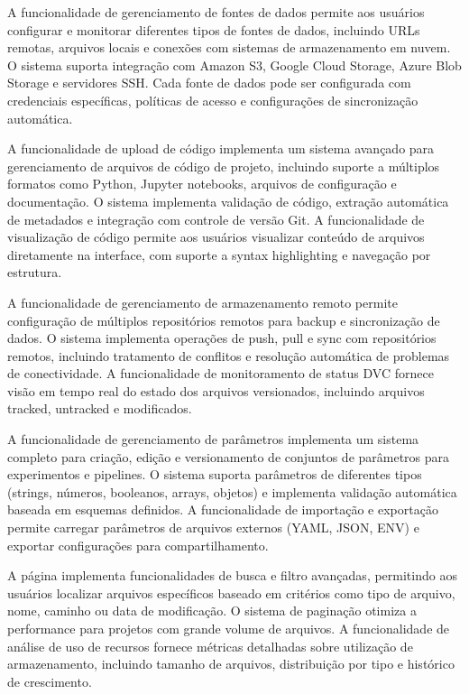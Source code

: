\documentclass[12pt,a4paper]{article}
\begin{document}
A funcionalidade de gerenciamento de fontes de dados permite aos usuários configurar e monitorar diferentes tipos de fontes de dados, incluindo URLs remotas, arquivos locais e conexões com sistemas de armazenamento em nuvem. O sistema suporta integração com Amazon S3, Google Cloud Storage, Azure Blob Storage e servidores SSH. Cada fonte de dados pode ser configurada com credenciais específicas, políticas de acesso e configurações de sincronização automática.

A funcionalidade de upload de código implementa um sistema avançado para gerenciamento de arquivos de código de projeto, incluindo suporte a múltiplos formatos como Python, Jupyter notebooks, arquivos de configuração e documentação. O sistema implementa validação de código, extração automática de metadados e integração com controle de versão Git. A funcionalidade de visualização de código permite aos usuários visualizar conteúdo de arquivos diretamente na interface, com suporte a syntax highlighting e navegação por estrutura.

A funcionalidade de gerenciamento de armazenamento remoto permite configuração de múltiplos repositórios remotos para backup e sincronização de dados. O sistema implementa operações de push, pull e sync com repositórios remotos, incluindo tratamento de conflitos e resolução automática de problemas de conectividade. A funcionalidade de monitoramento de status DVC fornece visão em tempo real do estado dos arquivos versionados, incluindo arquivos tracked, untracked e modificados.

A funcionalidade de gerenciamento de parâmetros implementa um sistema completo para criação, edição e versionamento de conjuntos de parâmetros para experimentos e pipelines. O sistema suporta parâmetros de diferentes tipos (strings, números, booleanos, arrays, objetos) e implementa validação automática baseada em esquemas definidos. A funcionalidade de importação e exportação permite carregar parâmetros de arquivos externos (YAML, JSON, ENV) e exportar configurações para compartilhamento.

A página implementa funcionalidades de busca e filtro avançadas, permitindo aos usuários localizar arquivos específicos baseado em critérios como tipo de arquivo, nome, caminho ou data de modificação. O sistema de paginação otimiza a performance para projetos com grande volume de arquivos. A funcionalidade de análise de uso de recursos fornece métricas detalhadas sobre utilização de armazenamento, incluindo tamanho de arquivos, distribuição por tipo e histórico de crescimento.
\end{document}
